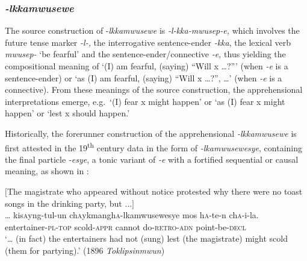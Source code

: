 \documentclass[output=paper,colorlinks,citecolor=brown]{langscibook}
\begin{document}
\subsubsection{\textit{-lkkamwusewe}} 
The source construction of \nobreakdash-\textit{lkkamwusewe} is \textit{\nobreakdash-l\nobreakdash-kka\nobreakdash-mwusep\nobreakdash-e,} which involves the future tense marker \textit{-l-,} the interrogative sentence-ender \textit{-kka}, the lexical verb \textit{mwusep-} `be fearful' and the sentence-ender/connective \textit{-e,} thus yielding the compositional meaning of `(I) am fearful, (saying) ``Will x …?''' (when \textit{-e} is a sentence-ender) or `as (I) am fearful, (saying) ``Will x …?'',  …' (when \textit{-e} is a connective). From these meanings of the source construction, the apprehensional interpretations emerge, e.g.\  `(I) fear x might happen' or `as (I) fear x might happen' or `lest x should happen.'


Historically, the forerunner construction of the apprehensional \textit{-lkkamwusewe} is first attested in the 19\textsuperscript{th} century data in the form of \textit{-lkamwusewesye}, containing the final particle \textit{-esye}, a tonic variant of \textit{-e} with a fortified sequential or causal meaning, as shown in :


\ea \label{ex:RK7} \textnormal{$[$The magistrate who appeared without notice protested why there were no toast songs in the drinking party, but $\ldots]$}\\
\gll … kis\textsc{a}yng-tul-un ch\textsc{a}ykmangh\textsc{a}-lkamwusewesye mos h\textsc{a}-te-n ch\textsc{a}-i-la. \\
{} entertainer-\textsc{pl-top} scold-\textsc{appr} cannot do-\textsc{retro-adn} point-be-\textsc{decl} \\
\glt `… (in fact) the entertainers had not (sung) lest (the magistrate) might scold (them for partying).' (1896 \textit{Toklipsinmwun})
\z
\end{document}
